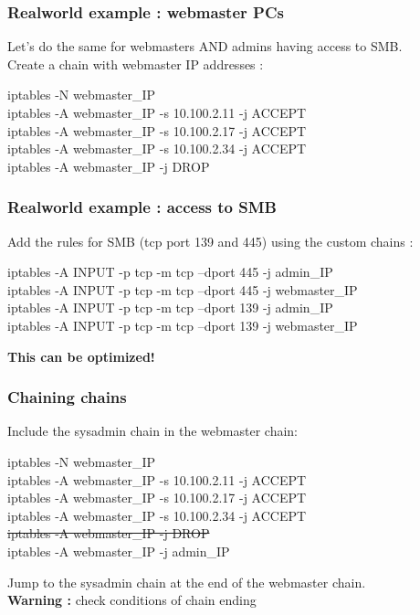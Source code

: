 \documentclass[14pt]{beamer}
\begin{document}
  \begin{frame}
    \frametitle{Realworld example : webmaster PCs}
    Let's do the same for webmasters AND admins having access to SMB.\\
    \pause
    Create a chain with webmaster IP addresses :
    \begin{example}
      \small{iptables -N webmaster\_IP\\
      iptables -A webmaster\_IP -s 10.100.2.11 -j ACCEPT\\
      iptables -A webmaster\_IP -s 10.100.2.17 -j ACCEPT\\
      iptables -A webmaster\_IP -s 10.100.2.34 -j ACCEPT\\
      iptables -A webmaster\_IP -j DROP}
    \end{example}
  \end{frame}
  \begin{frame}
    \frametitle{Realworld example : access to SMB}
    Add the rules for SMB (tcp port 139 and 445) using the custom chains :
    \begin{example}
      \small{iptables -A INPUT -p tcp -m tcp --dport 445 -j admin\_IP\\
      iptables -A INPUT -p tcp -m tcp --dport 445 -j webmaster\_IP\\
      iptables -A INPUT -p tcp -m tcp --dport 139 -j admin\_IP\\
      iptables -A INPUT -p tcp -m tcp --dport 139 -j webmaster\_IP}
    \end{example}
  \pause
  \textbf{This can be optimized!}
  \end{frame}
  \begin{frame}
    \frametitle{Chaining chains}
    Include the sysadmin chain in the webmaster chain:
    \begin{example}
      \small{iptables -N webmaster\_IP\\
      iptables -A webmaster\_IP -s 10.100.2.11 -j ACCEPT\\
      iptables -A webmaster\_IP -s 10.100.2.17 -j ACCEPT\\
      iptables -A webmaster\_IP -s 10.100.2.34 -j ACCEPT\\
      \sout{iptables -A webmaster\_IP -j DROP}\\
      iptables -A webmaster\_IP -j admin\_IP}
    \end{example}
    Jump to the sysadmin chain at the end of the webmaster chain.\\
    \textbf{Warning :} check conditions of chain ending
  \end{frame}
\end{document}
